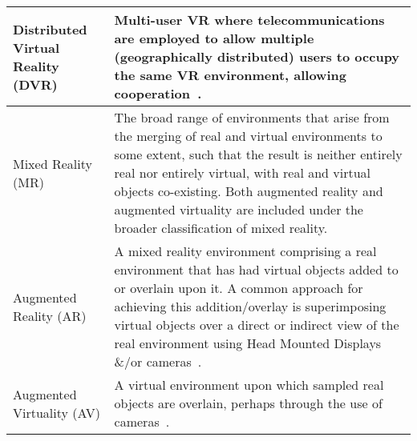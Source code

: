 \begin{center}
\begin{longtable}{ l p{10cm} }
\midrule
		

Distributed Virtual Reality (DVR) & Multi-user VR where telecommunications are employed to allow multiple (geographically distributed) users to occupy the same VR environment, allowing cooperation~\cite{Terashima2001}. \\

\midrule
		


Mixed Reality (MR) & The broad range of environments that arise from the merging of real and virtual environments to some extent, such that the result is neither entirely real nor entirely virtual, with real and virtual objects co-existing. Both augmented reality and augmented virtuality are included under the broader classification of mixed reality. \\

\hline
		

Augmented Reality (AR) & A mixed reality environment comprising a real environment that has had virtual objects added to or overlain upon it. A common approach for achieving this addition/overlay is superimposing virtual objects over a direct or indirect view of the real environment using Head Mounted Displays \&/or cameras~\cite{Krevelen2010}. \\



\midrule


Augmented Virtuality (AV) & A virtual environment upon which sampled real objects are overlain, perhaps through the use of cameras~\cite{caballero:behand}. \\


\end{longtable}
\end{center}
